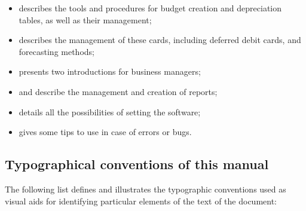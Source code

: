 \begin{itemize}
\item {} describes the tools and procedures for budget creation and depreciation tables, as well as their management;

\item {} describes the management of these cards, including deferred debit cards, and forecasting methods;

\item {} presents two introductions for business managers;

\item {} and  describe the management and creation of reports;

\item {} details all the possibilities of setting the software;

\item {} gives some tips to use in case of errors or bugs.

\end{itemize}

\subsection{Typographical conventions of this manual \label{introduction-manual-conventions}}

The following list defines and illustrates the typographic conventions used as visual aids for identifying particular elements of the text of the document:

